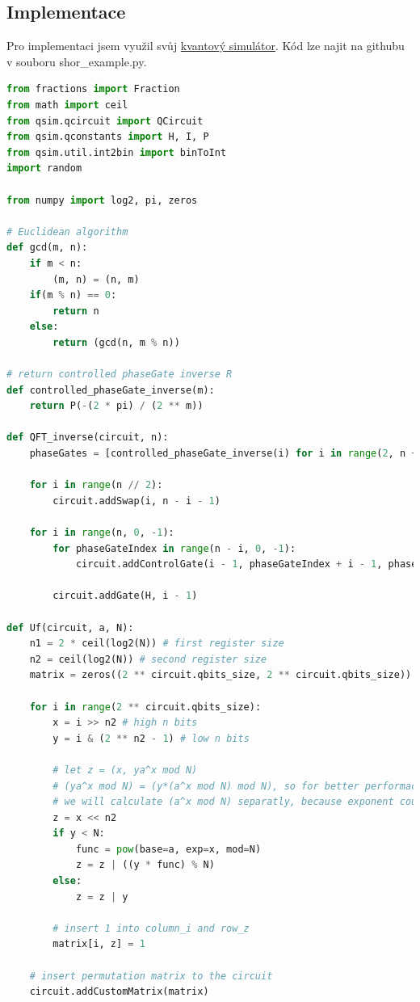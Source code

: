 \documentclass[11pt]{article}
\begin{document}
\subsection{Implementace}
Pro implementaci jsem využil svůj \hyperref[sec:QuantumEmulator]{kvantový simulátor}.
Kód lze najit na githubu v souboru shor\_example.py.
\begin{lstlisting}[language=Python, caption=Shor algorithm]
from fractions import Fraction
from math import ceil
from qsim.qcircuit import QCircuit
from qsim.qconstants import H, I, P
from qsim.util.int2bin import binToInt
import random

from numpy import log2, pi, zeros

# Euclidean algorithm
def gcd(m, n):
    if m < n: 
        (m, n) = (n, m)
    if(m % n) == 0:
        return n 
    else:
        return (gcd(n, m % n))

# return controlled phaseGate inverse R
def controlled_phaseGate_inverse(m):
    return P(-(2 * pi) / (2 ** m))

def QFT_inverse(circuit, n):
    phaseGates = [controlled_phaseGate_inverse(i) for i in range(2, n + 1)]

    for i in range(n // 2):
        circuit.addSwap(i, n - i - 1)

    for i in range(n, 0, -1):
        for phaseGateIndex in range(n - i, 0, -1):
            circuit.addControlGate(i - 1, phaseGateIndex + i - 1, phaseGates[phaseGateIndex - 1])

        circuit.addGate(H, i - 1)

def Uf(circuit, a, N):
    n1 = 2 * ceil(log2(N)) # first register size
    n2 = ceil(log2(N)) # second register size
    matrix = zeros((2 ** circuit.qbits_size, 2 ** circuit.qbits_size)) # fill matrix with zeros

    for i in range(2 ** circuit.qbits_size):
        x = i >> n2 # high n bits
        y = i & (2 ** n2 - 1) # low n bits

        # let z = (x, ya^x mod N)
        # (ya^x mod N) = (y*(a^x mod N) mod N), so for better performace
        # we will calculate (a^x mod N) separatly, because exponent could be large
        z = x << n2
        if y < N:
            func = pow(base=a, exp=x, mod=N) 
            z = z | ((y * func) % N) 
        else:
            z = z | y

        # insert 1 into column_i and row_z
        matrix[i, z] = 1
    
    # insert permutation matrix to the circuit
    circuit.addCustomMatrix(matrix)


\end{lstlisting}
\end{document}
